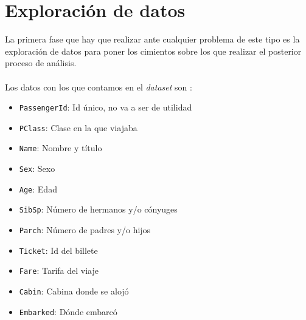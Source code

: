 
	
\setcounter{page}{0}

\maketitle %
\thispagestyle{empty}

\newpage %

\tableofcontents %


\newpage


\section{Exploración de datos}
\label{sec:exploracion-datos}

La primera fase que hay que realizar ante cualquier problema de este tipo es la exploración de datos para poner los cimientos sobre los que realizar el posterior proceso de análisis.
\\ \\
Los datos con los que contamos en el \textit{dataset} son \cite{KaggleTitanicData}:

\begin{itemize}
	\item \texttt{PassengerId}: Id único, no va a ser de utilidad
	\item \texttt{PClass}: Clase en la que viajaba
	\item \texttt{Name}: Nombre y título
	\item \texttt{Sex}: Sexo
	\item \texttt{Age}: Edad
	\item \texttt{SibSp}: Número de hermanos y/o cónyuges
	\item \texttt{Parch}: Número de padres y/o hijos
	\item \texttt{Ticket}: Id del billete
	\item \texttt{Fare}: Tarifa del viaje
	\item \texttt{Cabin}: Cabina donde se alojó
	\item \texttt{Embarked}: Dónde embarcó
\end{itemize}


